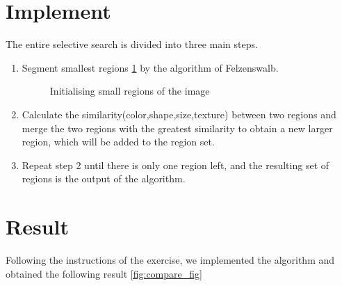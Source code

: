 \section*{Implement}
The entire selective search is divided into three main steps.
\begin{enumerate}
\item Segment smallest regions \ref{fig:first} by the algorithm of Felzenswalb\cite{felzenszwalb2004efficient}.
\begin{figure}[htbp]
	\centering

		\caption{Initialising small regions of the image}
	\label{fig:first}
\end{figure}	
\item Calculate the similarity(color,shape,size,texture) between two regions and merge the two regions with the greatest similarity to obtain a new larger region, which will be added to the region set.
\item Repeat step 2 until there is only one region left, and the resulting set of regions is the output of the algorithm.
\end{enumerate}


\section*{Result}
Following the instructions of the exercise, we implemented the algorithm and obtained the following result \ref{fig:compare_fig}



